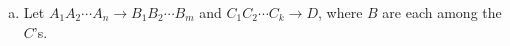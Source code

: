 \documentclass[12pt]{article}
\begin{document}
\begin{enumerate}[1.]
\begin{enumerate}[a)]











            \item

            Let $A_1A_2 \cdots A_n \to B_1B_2 \cdots B_m$ and $C_1C_2 \cdots C_k \to D$,
            where $B$ are each among the $C$'s.


\end{enumerate}
\end{enumerate}
\end{document}

